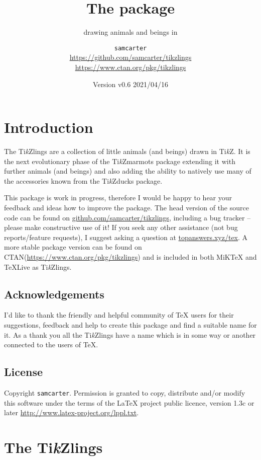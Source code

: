 \documentclass[parskip=half]{scrartcl}
\title{The \texorpdfstring{\tikzlings}{tikzlings} package}
\subtitle{drawing animals and beings in \TikZ}
\author{%
  \texorpdfstring{\texttt{samcarter}\\[0.8em]
    \url{https://github.com/samcarter/tikzlings}\\
    \url{https://www.ctan.org/pkg/tikzlings}
  }{samcarter}}
\date{Version v0.6 \textendash{} 2021/04/16}
\newcommand{\CTAN}{\textsc{CTAN}\xspace}
\newcommand{\TikZ}{Ti\emph{k}Z\xspace}
\newcommand{\tikzducks}{Ti\emph{k}Zducks\xspace}
\newcommand{\tikzmarmots}{Ti\emph{k}Zmarmots\xspace}
\newcommand{\tikzlings}{Ti\emph{k}Zlings\xspace}
\newcommand{\miktex}{MiK\TeX\xspace}
\newcommand{\texlive}{\TeX{}Live\xspace}
\begin{document}
\maketitle
\thispagestyle{scrheadings}

\section*{Introduction}
\label{intro}

The \tikzlings are a collection of little animals (and beings) drawn in \TikZ. It is the next evolutionary phase of the \tikzmarmots package extending it with further animals (and beings) and also adding the ability to natively use many of the accessories known from the \tikzducks package. 

This package is work in progress, therefore I would be happy to hear your feedback and ideas how to improve the package. 
The head version of the source code can be found on \url{github.com/samcarter/tikzlings}, including a bug tracker -- please make constructive use of it! 
If you seek any other assistance (not bug reports/feature requests), I suggest asking a question at \url{topanswers.xyz/tex}.
A more stable package version can be found on \CTAN (\url{https://www.ctan.org/pkg/tikzlings}) and is included in both \miktex and \texlive as \tikzlings. 

\subsection*{Acknowledgements}

I'd like to thank the friendly and helpful community of \TeX{} users for their suggestions, feedback and help to create this package and find a suitable name for it. As a thank you all the \tikzlings have a name which is in some way or another connected to the users of \TeX{}.

\subsection*{License}

Copyright 
\texttt{samcarter}. Permission is granted to copy, distribute and\slash or modify this software under the terms of the LaTeX project public licence, version 1.3c or later \url{http://www.latex-project.org/lppl.txt}.

\clearpage
\section*{The \tikzlings}
\end{document}
